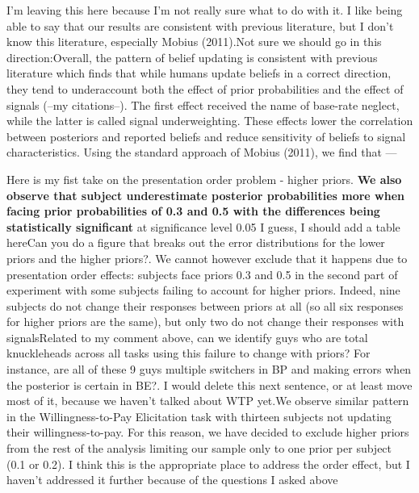 \documentclass[12pt,a4paper]{article}
\newcommand{\aut}[1]{{\color{Red}#1}}
\newcommand{\pmt}[1]{{\color{Blue}#1}}
\begin{document}
\pmt{I'm leaving this here because I'm not really sure what to do with it.  I like being able to say that our results are consistent with previous literature, but I don't know this literature, especially Mobius (2011).}\aut{Not sure we should go in this direction:}Overall, the pattern of belief updating is consistent with previous literature which finds that while humans update beliefs in a correct direction, they tend to underaccount both the effect of prior probabilities and the effect of signals (--my citations--). The first effect received the name of base-rate neglect, while the latter is called signal underweighting. These effects lower the correlation between posteriors and reported beliefs and reduce sensitivity of beliefs to signal characteristics. Using the standard approach of Mobius (2011), we find that --- 

\aut{Here is my fist take on the presentation order problem - higher priors.}
\textbf{We also observe that subject underestimate posterior probabilities more when facing prior probabilities of 0.3 and 0.5 with the differences being statistically significant} at significance level 0.05 \aut{I guess, I should add a table here}\pmt{Can you do a figure that breaks out the error distributions for the lower priors and the higher priors?}. We cannot however exclude that it happens due to presentation order effects: subjects face priors 0.3 and 0.5 in the second part of experiment with some subjects failing to account for higher priors. Indeed, nine subjects do not change their responses between priors at all (so all six responses for higher priors are the same), but only two do not change their responses with signals\pmt{Related to my comment above, can we identify guys who are total knuckleheads across all tasks using this failure to change with priors?  For instance, are all of these 9 guys multiple switchers in BP and making errors when the posterior is certain in BE?}. \pmt{I would delete this next sentence, or at least move most of it, because we haven't talked about WTP yet.}We observe similar pattern in the Willingness-to-Pay Elicitation task with thirteen subjects not updating their willingness-to-pay. For this reason, we have decided to exclude higher priors from the rest of the analysis limiting our sample only to one prior per subject (0.1 or 0.2).
\pmt{I think this is the appropriate place to address the order effect, but I haven't addressed it further because of the questions I asked above}
\end{document}
